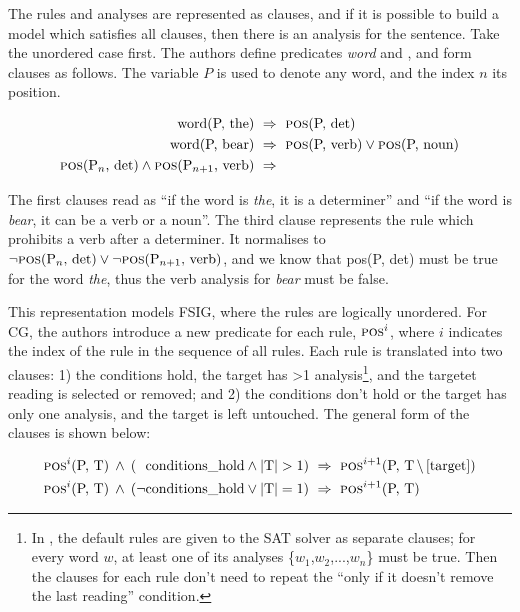 The rules and analyses are represented as clauses, and if it is
possible to build a model which satisfies all clauses, then there is
an analysis for the sentence.
Take the unordered case first. The authors define predicates \emph{word}
and \emph{}, and form clauses as follows. The variable $P$ is used to
denote any word, and the index $n$ its position.

\begin{align*}
\text{word(P, the)} \  &\Rightarrow \ \text{{\sc pos}(P, det)} \\
\text{word(P, bear)} \ &\Rightarrow \ \text{{\sc pos}(P, verb)} \vee \text{{\sc pos}(P, noun)} \\
\text{{\sc pos}(P$_n$, det)} \wedge \text{{\sc pos}(P$_{n+1}$, verb)} \ &\Rightarrow 
\end{align*}

\noindent The first clauses read as ``if the word is \emph{the}, it
is a determiner'' and ``if the word is \emph{bear}, it can be a verb or a noun''.
The third clause represents the rule which prohibits a verb after a
determiner. It normalises to $\neg \text{{\sc pos}(P$_n$, det)} \vee \neg \text{{\sc pos}(P$_{n+1}$, verb)}$, and we know that {\sc pos}(P, det) must be true for
the word \emph{the}, thus the verb analysis for \emph{bear} must be
false.

This representation models FSIG, where the rules are logically
unordered. For CG, the authors introduce a new predicate for each rule,
$\text{{\sc pos}}^i$, where $i$ indicates the index of the rule in the
sequence of all rules.
Each rule is translated into two
clauses: 1) the conditions hold, the target has >1 analysis\footnote{In \cite{listenmaa_claessen2015}, the default rules
  are given to the SAT solver as separate clauses; for every word
  $w$, at least one of its analyses \{$w_1$,$w_2$,...,$w_n$\} must be
  true. Then the clauses for each rule don't need to repeat the ``only
  if it doesn't remove the last reading'' condition.}, and the 
targetet reading is selected or removed; and
2) the conditions don't hold or the target has only one analysis, and the target is left untouched. The general form of the clauses is shown below:

\begin{align*}
\text{{\sc pos}}^i\text{(P, T)} \: \wedge \: (\;\:\,  \text{conditions\_hold}
\wedge  \text{|T|} > 1) \  &\Rightarrow \  \text{{\sc pos}}^{i+1}\text{(P, T$\,\setminus\,$[target])} \\
\text{{\sc pos}}^i\text{(P, T)} \: \wedge \: (\neg \text{conditions\_hold} \vee
\text{|T|} = 1) \  &\Rightarrow \ \text{{\sc pos}}^{i+1}\text{(P, T)}
\end{align*}


